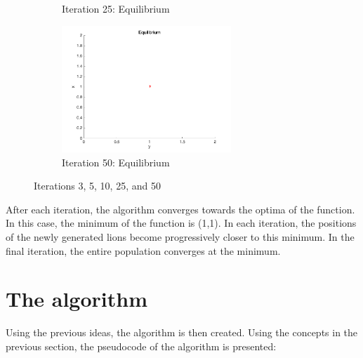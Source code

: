 \begin{figure}[H]
\begin{subfigure}[b]{0.45\textwidth}
\begin{center}
\caption{Iteration 25: Equilibrium}
\end{center}
\end{subfigure}
\begin{subfigure}[b]{0.45\textwidth}
\begin{center}
\includegraphics[width=0.7\textwidth]{img/mdme/equilibrium50}
\caption{Iteration 50: Equilibrium}
\end{center}
\end{subfigure}
\caption{Iterations 3, 5, 10, 25, and 50}
\end{figure}

After each iteration, the algorithm converges towards the optima of the function. In this case, the minimum of the function is (1,1). In each iteration, the positions of the newly generated lions become progressively closer to this minimum. In the final iteration, the entire population converges at the minimum.

\section{The algorithm}

Using the previous ideas, the algorithm is then created. Using the concepts in the previous section, the pseudocode of the algorithm is presented:

